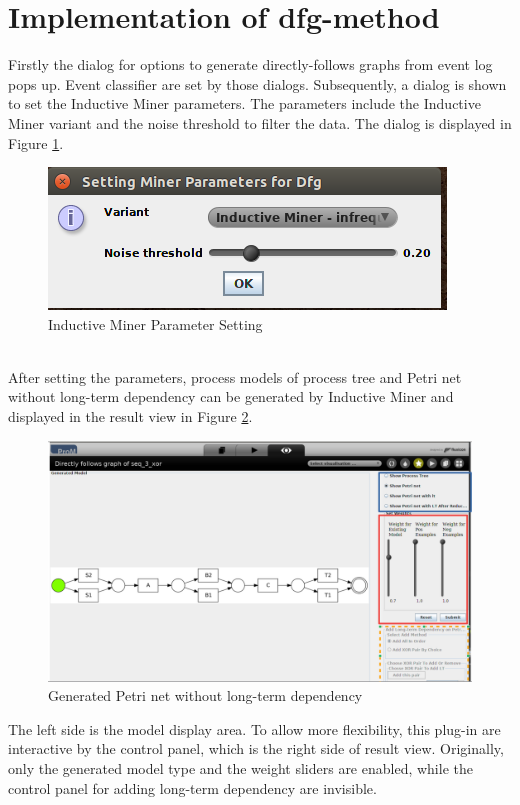\section{Implementation of dfg-method }
Firstly the dialog for options to generate directly-follows graphs from event log pops up. Event classifier are set by those dialogs. Subsequently, a dialog is shown to set the Inductive Miner parameters. The parameters include the Inductive Miner variant and the noise threshold to filter the data. The dialog is displayed in Figure \ref{fig:dfg-IM-setting}.
\begin{figure}
	\centering
	\includegraphics[scale=0.75]{figures/implementation/dfg-IM-setting.png}
	\caption{Inductive Miner Parameter Setting}
	\label{fig:dfg-IM-setting}
\end{figure} \\
After setting the parameters, process models  of process tree and Petri net without long-term dependency can be generated by Inductive Miner and displayed in the result view in Figure \ref{fig:dfg-IM-pn-without-lt}. 
\begin{figure}
	\centering
	\includegraphics[width=\textwidth]{figures/implementation/dfg-IM-pn-without-lt.png}
	\caption{Generated Petri net without long-term dependency}
	\label{fig:dfg-IM-pn-without-lt}
\end{figure}
The left side is the model display area. To allow more flexibility, this plug-in are interactive by the control panel, which is the right side of result view. Originally, only the generated model type and the weight sliders are enabled, while the control panel for adding long-term dependency are invisible. 


